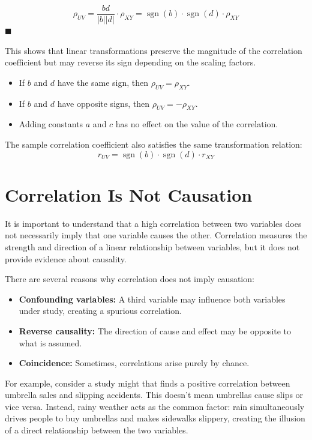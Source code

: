 \documentclass[twoside]{book}
\begin{document}
\[
\rho_{UV} =  \dfrac{bd}{|b||d|} \cdot \rho_{XY} = \operatorname{sgn}(b) \cdot \operatorname{sgn}(d) \cdot \rho_{XY}
\]
\hfill $\blacksquare$

This shows that linear transformations preserve the magnitude of the correlation coefficient but may reverse its sign depending on the scaling factors.
\begin{itemize}
	\item If \(b\) and \(d\) have the same sign, then \(\rho_{UV} = \rho_{XY}\).
	\item If \(b\) and \(d\) have opposite signs, then \(\rho_{UV} = -\rho_{XY}\).
	\item Adding constants \(a\) and \(c\) has no effect on the value of the correlation.
\end{itemize}

The sample correlation coefficient also satisfies the same transformation relation:
\[
r_{UV} = \operatorname{sgn}(b) \cdot \operatorname{sgn}(d) \cdot r_{XY}
\]


\section{Correlation Is Not Causation}

It is important to understand that a high correlation between two variables does not necessarily imply that one variable causes the other. Correlation measures the strength and direction of a linear relationship between variables, but it does not provide evidence about causality.

There are several reasons why correlation does not imply causation:

\begin{itemize}
	\item \textbf{Confounding variables:} A third variable may influence both variables under study, creating a spurious correlation.
	\item \textbf{Reverse causality:} The direction of cause and effect may be opposite to what is assumed.
	\item \textbf{Coincidence:} Sometimes, correlations arise purely by chance.
\end{itemize}

For example, consider a study might that finds a positive correlation between umbrella sales and slipping accidents. This doesn't mean umbrellas cause slips or vice versa. Instead, rainy weather acts as the common factor: rain simultaneously drives people to buy umbrellas and makes sidewalks slippery, creating the illusion of a direct relationship between the two variables.
\end{document}
